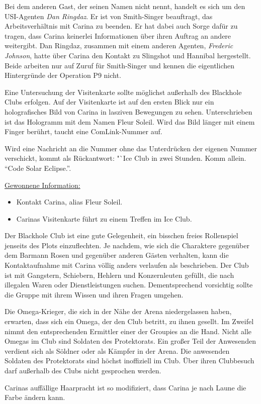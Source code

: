 Bei dem anderen Gast, der seinen Namen nicht nennt, handelt es sich um den USI-Agenten \emph{Dan Ringdaz}. Er ist von Smith-Singer beauftragt, das Arbeitsverhältnis mit Carina zu beenden. Er hat dabei auch Sorge dafür zu tragen, dass Carina keinerlei Informationen über ihren Auftrag an andere weitergibt. Dan Ringdaz, zusammen mit einem anderen Agenten, \emph{Frederic Johnson}, hatte über Carina den Kontakt zu Slingshot und Hannibal hergestellt. Beide arbeiten nur auf Zuruf für Smith-Singer und kennen die eigentlichen Hintergründe der Operation P9 nicht.


Eine Untersuchung der Visitenkarte sollte möglichst außerhalb des Blackhole Clubs erfolgen. Auf der Visitenkarte ist auf den ersten Blick nur ein holografisches Bild von Carina in lasziven Bewegungen zu sehen. Unterschrieben ist das Hologramm mit dem Namen Fleur Soleil. Wird das Bild länger mit einem Finger berührt, taucht eine ComLink-Nummer auf.

Wird eine Nachricht an die Nummer ohne das Unterdrücken der eigenen Nummer verschickt, kommt als Rückantwort: "`Ice Club in zwei Stunden. Komm allein. "`Code Solar Eclipse."'.

\begin{remarks}
	\underline{Gewonnene Information:}

	\begin{itemize}
		\item Kontakt Carina, alias Fleur Soleil.
		\item Carinas Visitenkarte führt zu einem Treffen im Ice Club.
	\end{itemize}

	Der Blackhole Club ist eine gute Gelegenheit, ein bisschen freies Rollenspiel jenseits des Plots einzuflechten. Je nachdem, wie sich die Charaktere gegenüber dem Barmann Rosen und gegenüber anderen Gästen verhalten, kann die Kontaktaufnahme mit Carina völlig anders verlaufen als beschrieben. Der Club ist mit Gangstern, Schiebern, Hehlern und Konzernleuten gefüllt, die nach illegalen Waren oder Dienstleistungen suchen. Dementsprechend vorsichtig sollte die Gruppe mit ihrem Wissen und ihren Fragen umgehen.

	Die Omega-Krieger, die sich in der Nähe der Arena niedergelassen haben, erwarten, dass sich ein Omega, der den Club betritt, zu ihnen gesellt. Im Zweifel nimmt den entsprechenden Ermittler einer der Groupies an die Hand. Nicht alle Omegas im Club sind Soldaten des Protektorats. Ein großer Teil der Anwesenden verdient sich als Söldner oder als Kämpfer in der Arena. Die anwesenden Soldaten des Protektorats sind höchst inoffiziell im Club. Über ihren Clubbesuch darf außerhalb des Clubs nicht gesprochen werden.
	
	Carinas auffällige Haarpracht ist so modifiziert, dass Carina je nach Laune die Farbe ändern kann.
\end{remarks}


